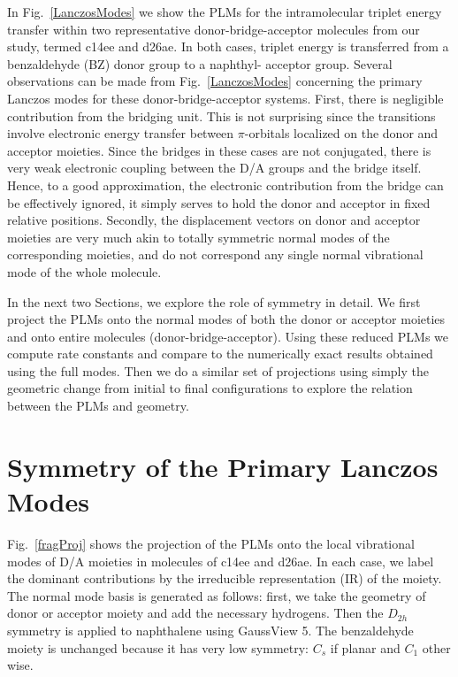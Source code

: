 In Fig.~\ref{LanczosModes}  we show the PLMs for the
intramolecular triplet energy transfer within
two representative donor-bridge-acceptor molecules from our study, termed c14ee and d26ae.
In both cases, triplet energy is transferred from a benzaldehyde (BZ) donor group to a naphthyl- acceptor group.
Several observations can be made from Fig.~\ref{LanczosModes} concerning the primary Lanczos modes for these
donor-bridge-acceptor systems. First, there is negligible contribution from the bridging unit.
This is not surprising since the transitions involve  electronic energy
 transfer between $\pi$-orbitals localized on the donor and acceptor moieties.
 Since the bridges in these cases
are not conjugated, there is very weak electronic coupling between the D/A groups and the bridge itself.
Hence, to a good approximation, the electronic
contribution from the bridge can be effectively ignored, it simply serves to hold the donor and acceptor in fixed relative positions.
Secondly, the displacement vectors on donor and acceptor moieties are very much akin to  totally symmetric normal modes
of the corresponding moieties, and do not correspond any single normal vibrational  mode of the whole molecule.

In the next two Sections, we explore the role of symmetry in detail.
We first project the PLMs onto the normal modes of both the donor or acceptor moieties
and onto entire molecules (donor-bridge-acceptor).  Using these reduced PLMs we
 compute rate constants and compare to the numerically exact results obtained using the full
modes.  Then we do a similar set of projections using simply the geometric change from initial to final configurations
to explore  the relation between the PLMs and geometry.



\section{Symmetry of the Primary Lanczos Modes}

Fig.~\ref{fragProj} shows the projection of the PLMs  onto the local vibrational modes of
D/A moieties in molecules of c14ee and d26ae.
In each case, we label the dominant contributions by the
irreducible representation (IR) of the moiety. The normal mode basis is generated as follows:
first, we take the geometry of donor or acceptor moiety and add  the necessary hydrogens.
Then the $D_{2h}$ symmetry is applied to naphthalene using GaussView 5.
The benzaldehyde moiety is unchanged because it has very low  symmetry:  $C_{s}$ if planar and $C_{1}$  other wise.

